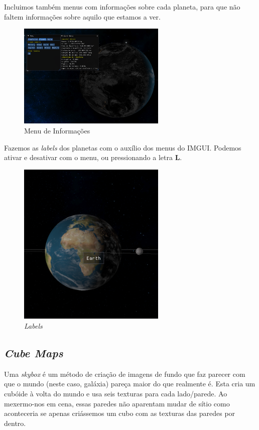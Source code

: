 \noindent
Incluimos também menus com informações sobre cada planeta, para que não faltem informações sobre aquilo que estamos a ver.

\enlargethispage{1in}
\thispagestyle{empty}
\begin{figure}[h]
    \centering
    \includegraphics[width=200pt]{earth_menu.png}
    \caption{Menu de Informações}
\end{figure}

\newpage

\noindent
Fazemos as \textit{labels} dos planetas com o auxílio dos menus do \ac{IMGUI}. Podemos ativar e desativar com o menu, ou pressionando a letra \textbf{L}.

\begin{figure}[h]
    \centering
    \includegraphics[width=200pt]{labels.png}
    \caption{\textit{Labels}}
\end{figure}

\subsection{\textit{Cube Maps}}
\label{chap2:sec:cube_maps}

\noindent
Uma \textit{skybox} é um método de criação de imagens de fundo que 
faz parecer com que o mundo (neste caso, galáxia) pareça maior do que realmente é. 
Esta cria um cubóide à volta do mundo e usa seis texturas para cada lado/parede. 
Ao mexermo-nos em cena, essas paredes não aparentam mudar de sítio como aconteceria se apenas criássemos um cubo com as texturas das paredes por dentro.

